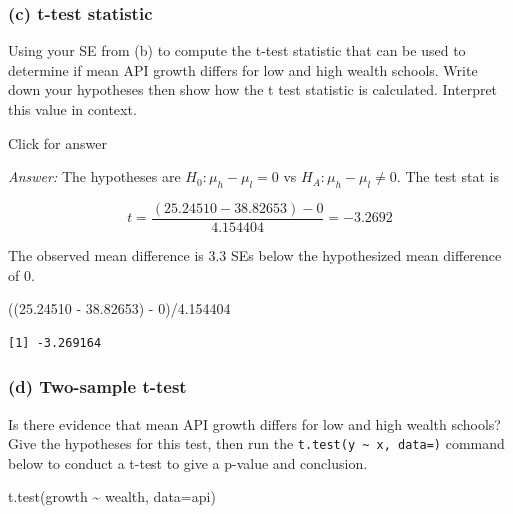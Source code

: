 \documentclass[
]{book}
\newenvironment{Shaded}{\begin{snugshade}}{\end{snugshade}}
\newcommand{\AttributeTok}[1]{\textcolor[rgb]{0.77,0.63,0.00}{#1}}
\newcommand{\DecValTok}[1]{\textcolor[rgb]{0.00,0.00,0.81}{#1}}
\newcommand{\FloatTok}[1]{\textcolor[rgb]{0.00,0.00,0.81}{#1}}
\newcommand{\FunctionTok}[1]{\textcolor[rgb]{0.00,0.00,0.00}{#1}}
\newcommand{\NormalTok}[1]{#1}
\newcommand{\SpecialCharTok}[1]{\textcolor[rgb]{0.00,0.00,0.00}{#1}}
\begin{document}
\hypertarget{c-t-test-statistic-1}{%
\subsubsection{(c) t-test statistic}\label{c-t-test-statistic-1}}

Using your SE from (b) to compute the t-test statistic that can be used to determine if mean API growth differs for low and high wealth schools. Write down your hypotheses then show how the t test statistic is calculated. Interpret this value in context.

Click for answer

\emph{Answer:} The hypotheses are \(H_0: \mu_h - \mu_l = 0\) vs \(H_A: \mu_h - \mu_l \neq 0\). The test stat is

\[t = \dfrac{(25.24510 - 38.82653) - 0}{4.154404} = -3.2692\]

The observed mean difference is 3.3 SEs below the hypothesized mean difference of 0.

\begin{Shaded}
\begin{Highlighting}[]
\NormalTok{((}\FloatTok{25.24510} \SpecialCharTok{{-}} \FloatTok{38.82653}\NormalTok{) }\SpecialCharTok{{-}} \DecValTok{0}\NormalTok{)}\SpecialCharTok{/}\FloatTok{4.154404} 
\end{Highlighting}
\end{Shaded}

\begin{verbatim}
[1] -3.269164
\end{verbatim}

\hypertarget{d-two-sample-t-test}{%
\subsubsection{(d) Two-sample t-test}\label{d-two-sample-t-test}}

Is there evidence that mean API growth differs for low and high wealth schools? Give the hypotheses for this test, then run the \texttt{t.test(y\ \textasciitilde{}\ x,\ data=)} command below to conduct a t-test to give a p-value and conclusion.

\begin{Shaded}
\begin{Highlighting}[]
\FunctionTok{t.test}\NormalTok{(growth }\SpecialCharTok{\textasciitilde{}}\NormalTok{ wealth, }\AttributeTok{data=}\NormalTok{api)}
\end{Highlighting}
\end{Shaded}
\end{document}
